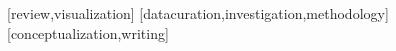\documentclass{textolivre}
\begin{document}
\printbibliography\label{sec-bib}

\begin{contributors}
[review,visualization]
[datacuration,investigation,methodology]
[conceptualization,writing]
\end{contributors}
\end{document}
